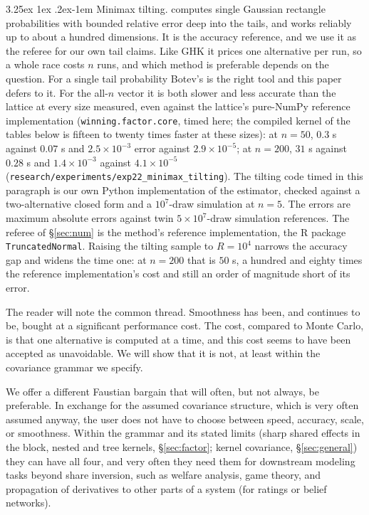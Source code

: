 \documentclass[11pt]{article}
\makeatletter
\renewcommand\paragraph{\@startsection{paragraph}{4}{\z@}%
  {3.25ex \@plus1ex \@minus.2ex}{-1em}%
  {\normalfont\normalsize\itshape}}
\makeatother
\begin{document}
\paragraph{Minimax tilting.} \citet{botev2017} computes single Gaussian
rectangle probabilities with bounded relative error deep into the tails,
and works reliably up to about a hundred dimensions. It is the accuracy reference, and
we use it as the referee for our own tail claims. Like GHK it prices one
alternative per run, so a whole race costs $n$ runs, and which method is
preferable depends on the question. For a single tail probability Botev's
is the right tool and this paper defers to it. For the all-$n$ vector it
is both slower and less accurate than the lattice at every size measured,
even against the lattice's pure-NumPy reference implementation
(\texttt{winning.factor.core}, timed here; the compiled kernel of the
tables below is fifteen to twenty times faster at these sizes):
at $n=50$, $0.3$ s against $0.07$ s and $2.5\times10^{-3}$ error against
$2.9\times10^{-5}$; at $n=200$, $31$ s against $0.28$ s and
$1.4\times10^{-3}$ against $4.1\times10^{-5}$
(\texttt{research/experiments/exp22\_minimax\_tilting}). The tilting
code timed in this paragraph is our own Python implementation of the
estimator, checked against a two-alternative closed form and a
$10^{7}$-draw simulation at $n=5$. The errors are maximum absolute
errors against twin $5\times10^{7}$-draw simulation references. The
referee of \S\ref{sec:num} is the method's reference implementation, the
R package \texttt{TruncatedNormal}. Raising the
tilting sample to $R=10^{4}$ narrows the accuracy gap and widens the time
one: at $n=200$ that is $50$ s, a hundred and eighty times the reference
implementation's cost and still an order of magnitude short of its error.

\medskip

The reader will note the common thread. Smoothness has been, and continues to be, bought at a significant performance cost. The cost, compared to Monte Carlo, is that one alternative is computed at a time, and this cost seems to have been accepted as unavoidable. We will show that it is not, at least within the covariance grammar we specify.

We offer a different Faustian bargain that will often, but not always, be preferable. In exchange for the assumed covariance structure, which is very often assumed anyway, the user does not have to choose between
speed, accuracy, scale, or smoothness. Within the grammar and its stated limits (sharp shared effects in the block, nested and tree kernels, \S\ref{sec:factor}; kernel covariance, \S\ref{sec:general}) they can have all four, and very often they need them for downstream modeling tasks beyond share inversion, such as welfare analysis, game theory, and propagation of derivatives to other parts of a system (for ratings or belief networks).
\end{document}
